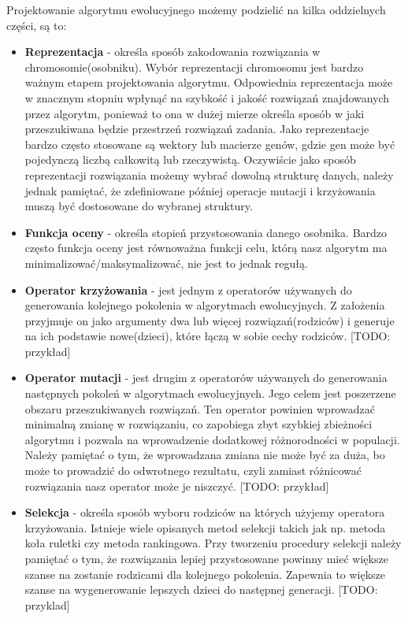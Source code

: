 Projektowanie algorytmu ewolucyjnego możemy podzielić na kilka oddzielnych części, są to: 
\begin{itemize}
    \item \textbf{Reprezentacja} - określa sposób zakodowania rozwiązania w chromosomie(osobniku). Wybór reprezentacji chromosomu jest bardzo ważnym etapem 
    projektowania algorytmu. Odpowiednia reprezentacja może w znacznym stopniu wpłynąć na szybkość i jakość rozwiązań znajdowanych przez 
    algorytm, ponieważ to ona w dużej mierze określa sposób w jaki przeszukiwana będzie przestrzeń rozwiązań zadania. 
    Jako reprezentacje bardzo często stosowane są wektory lub macierze genów, gdzie gen może być pojedynczą liczbą całkowitą lub rzeczywistą. 
    Oczywiście jako sposób reprezentacji rozwiązania możemy wybrać dowolną strukturę danych, należy jednak pamiętać, że zdefiniowane później 
    operacje mutacji i krzyżowania muszą być dostosowane do wybranej struktury.
    
    \item \textbf{Funkcja oceny} - określa stopień przystosowania danego osobnika. Bardzo często funkcja oceny jest równoważna funkcji celu, którą 
    nasz algorytm ma minimalizować/maksymalizować, nie jest to jednak regułą. 

    \item \textbf{Operator krzyżowania} - jest jednym z operatorów używanych do generowania kolejnego pokolenia w algorytmach ewolucyjnych. Z założenia 
    przyjmuje on jako argumenty dwa lub więcej rozwiązań(rodziców) i generuje na ich podstawie nowe(dzieci), które łączą w sobie cechy rodziców. 
    [TODO: przykład]

    \item \textbf{Operator mutacji} - jest drugim z operatorów używanych do generowania następnych pokoleń w algorytmach ewolucyjnych. Jego celem jest 
    poszerzene obszaru przeszukiwanych rozwiązań. Ten operator powinien wprowadzać minimalną zmianę w rozwiązaniu, co zapobiega zbyt szybkiej 
    zbieżności algorytmu i pozwala na wprowadzenie dodatkowej różnorodności w populacji. Należy pamiętać o tym, że wprowadzana zmiana nie może 
    być za duża, bo może to prowadzić do odwrotnego rezultatu, czyli zamiast różnicować rozwiązania nasz operator może je niszczyć.
    [TODO: przykład]

    \item \textbf{Selekcja} - określa sposób wyboru rodziców na których użyjemy operatora krzyżowania. Istnieje wiele opisanych metod selekcji\cite{SELECTION-METHODS} 
    takich jak np. metoda koła ruletki czy metoda rankingowa. Przy tworzeniu procedury selekcji należy pamiętać 
    o tym, że rozwiązania lepiej przystosowane powinny mieć większe szanse na zostanie rodzicami dla kolejnego pokolenia. Zapewnia to większe 
    szanse na wygenerowanie lepszych dzieci do następnej generacji.
    [TODO: przyklad]


\end{itemize}
